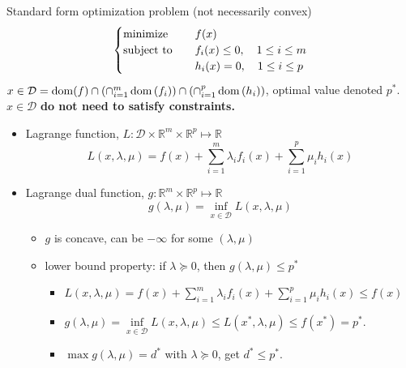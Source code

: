 \begin{remark}
    Standard form optimization problem (not necessarily convex)\[\begin{cases}
        \operatorname{minimize} \quad &f(x)\\
        \operatorname{subject\ to} \quad &f_i(x) \le 0, \quad 1 \le i \le m\\
        &h_i(x) = 0, \quad 1 \le i \le p
    \end{cases}\]
    $x \in \mathcal{D} =\operatorname{dom}(f) \cap\left(\cap_{i=1}^{m} \operatorname{dom}\left(f_{i}\right)\right) \cap\left(\cap_{i=1}^{p} \operatorname{dom}\left(h_{i}\right)\right)$, optimal value denoted $p^*$. $x \in \mathcal{D}$ \textbf{do not need to satisfy constraints.}
    \begin{itemize}
        \item Lagrange function, $L: \mathcal{D} \times \mathbb{R}^m \times \mathbb{R}^p \mapsto \mathbb{R}$ \[L(x, \lambda, \mu) = f(x) + \sum_{i = 1}^m\lambda_if_i(x) + \sum_{i = 1}^p \mu_ih_i(x)\]
        \item Lagrange dual function, $g: \mathbb{R}^m \times \mathbb{R}^p \mapsto \mathbb{R}$ \[g(\lambda, \mu) = \inf_{x \in \mathcal{D}} L(x, \lambda, \mu)\]\begin{itemize}
            \item $g$ is concave, can be $-\infty$ for some $(\lambda, \mu)$
            \item lower bound property: if $\lambda \succeq 0$, then $g(\lambda, \mu) \le p^*$\begin{itemize}
                \item $L(x, \lambda, \mu) = f(x) + \sum_{i = 1}^m\lambda_if_i(x) + \sum_{i = 1}^p \mu_ih_i(x) \le f(x)$
                \item $g(\lambda, \mu) = \underset{x \in \mathcal{D}}{\inf}L(x, \lambda, \mu) \le L(x^*, \lambda, \mu) \le f(x^*) = p^*$.
                \item $\max g(\lambda, \mu) = d^*$ with $\lambda \succeq 0$, get $d^* \le p^*$.
            \end{itemize}
        \end{itemize}
    \end{itemize}
\end{remark}

